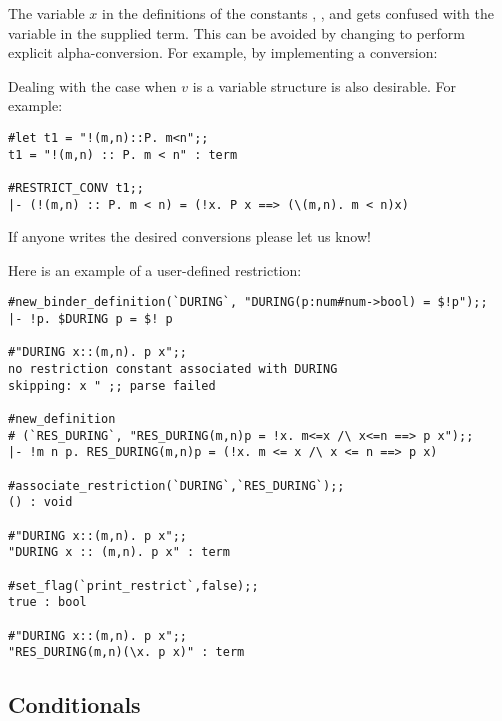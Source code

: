 The variable $x$ in the definitions of the constants
, ,  and
 gets confused with the variable in the supplied term.
This can be avoided by changing  to perform
explicit alpha-conversion. For example, by implementing a conversion:

\begin{hol}
{\small\verb%   RES_FORALL %}$P${\small\verb% (\%}$v$\ml{.}$B$\ml{[}$v$\ml{])  ---->  !}$v$\ml{. }$P$ $v$\ml{ ==> }$B$\ml{[}$v$\ml{]}
\end{hol}

\noindent Dealing with the case when
$v$ is a variable structure is also desirable. For example:

\begin{session}\begin{verbatim}
#let t1 = "!(m,n)::P. m<n";;
t1 = "!(m,n) :: P. m < n" : term

#RESTRICT_CONV t1;;
|- (!(m,n) :: P. m < n) = (!x. P x ==> (\(m,n). m < n)x)

\end{verbatim}\end{session}

\noindent If anyone writes the desired conversions please let us know!

Here is an example of a user-defined restriction:

\begin{session}\begin{verbatim}
#new_binder_definition(`DURING`, "DURING(p:num#num->bool) = $!p");;
|- !p. $DURING p = $! p

#"DURING x::(m,n). p x";;
no restriction constant associated with DURING
skipping: x " ;; parse failed  

#new_definition
# (`RES_DURING`, "RES_DURING(m,n)p = !x. m<=x /\ x<=n ==> p x");;
|- !m n p. RES_DURING(m,n)p = (!x. m <= x /\ x <= n ==> p x)

#associate_restriction(`DURING`,`RES_DURING`);;
() : void

#"DURING x::(m,n). p x";;
"DURING x :: (m,n). p x" : term

#set_flag(`print_restrict`,false);;
true : bool

#"DURING x::(m,n). p x";;
"RES_DURING(m,n)(\x. p x)" : term
\end{verbatim}\end{session}




\subsection{Conditionals}
\label{conditionals}

